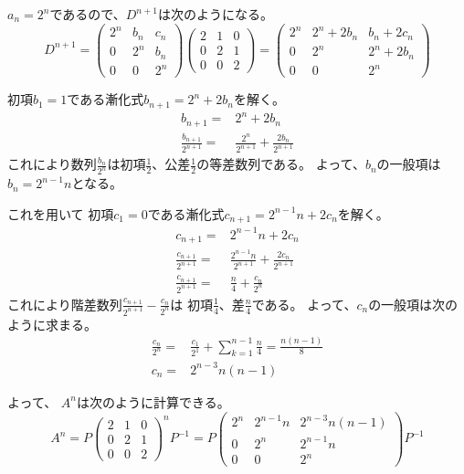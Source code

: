 \documentclass[12pt,b5paper]{ltjsarticle}
\begin{document}
$a_n=2^n$であるので、$D^{n+1}$は次のようになる。
\begin{equation}
 D^{n+1}=
  \begin{pmatrix}
   2^n & b_n & c_n \\
   0 & 2^n & b_n \\
   0 & 0 & 2^n
  \end{pmatrix}
  \begin{pmatrix}
   2 & 1 & 0 \\
   0 & 2 & 1 \\
   0 & 0 & 2
  \end{pmatrix}
  =
  \begin{pmatrix}
   2^n & 2^n+2b_n & b_n+2c_n \\
   0 & 2^n & 2^n+2b_n \\
   0 & 0 & 2^n
  \end{pmatrix}
\end{equation}

初項$b_1=1$である漸化式$b_{n+1}=2^n+2b_n$を解く。
\begin{align}
 b_{n+1} =& 2^n+2b_n\\
 \frac{b_{n+1}}{2^{n+1}} =& \frac{2^n}{2^{n+1}}+\frac{2b_n}{2^{n+1}}
\end{align}
これにより数列$\frac{b_n}{2^n}$は初項$\frac{1}{2}$、公差$\frac{1}{2}$の等差数列である。
よって、$b_n$の一般項は
$b_n=2^{n-1}n$となる。

これを用いて
初項$c_1=0$である漸化式$c_{n+1}=2^{n-1}n+2c_n$を解く。
\begin{align}
 c_{n+1} =& 2^{n-1}n+2c_n\\
 \frac{c_{n+1}}{2^{n+1}} =& \frac{2^{n-1}n}{2^{n+1}}+\frac{2c_n}{2^{n+1}}\\
 \frac{c_{n+1}}{2^{n+1}} =& \frac{n}{4}+\frac{c_n}{2^{n}}
\end{align}
これにより階差数列$\frac{c_{n+1}}{2^{n+1}}-\frac{c_{n}}{2^{n}}$は
初項$\frac{1}{4}$、差$\frac{n}{4}$である。
よって、$c_n$の一般項は次のように求まる。
\begin{align}
 \frac{c_{n}}{2^{n}}
 =& \frac{c_1}{2^1} + \sum_{k=1}^{n-1}\frac{n}{4}
 = \frac{n(n-1)}{8}\\
 c_n =& 2^{n-3}n(n-1)
\end{align}

よって、
$A^n$は次のように計算できる。
\begin{equation}
 A^n = P
  \begin{pmatrix}
   2 & 1 & 0 \\
   0 & 2 & 1 \\
   0 & 0 & 2
  \end{pmatrix}^n
  P^{-1}
  =
  P
  \begin{pmatrix}
   2^n & 2^{n-1}n & 2^{n-3}n(n-1) \\
   0 & 2^n & 2^{n-1}n \\
   0 & 0 & 2^n
  \end{pmatrix}
  P^{-1}
\end{equation}
\end{document}
